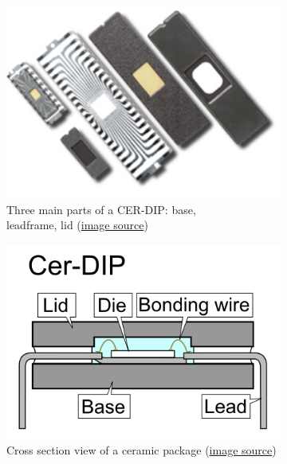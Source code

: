 \documentclass[final]{cubedoc}
\begin{document}
	\begin{figure}[h!]
		\centering
		\begin{subfigure}{.5\textwidth}
			\centering
			\includegraphics[height=0.2\textheight, width=\textwidth, keepaspectratio]{docs/cer_dip_real.png}
			\caption{Three main parts of a CER-DIP: base,\\ 
				leadframe, lid  \small{(\href{https://web.archive.org/web/20200818153119/https://www.spectrum-semi.com/cerdip}{image source}})}
			\label{fig:sub1}
		\end{subfigure}%
		\begin{subfigure}{.5\textwidth}
			\centering
			\includegraphics[height=0.2\textheight, width=\textwidth, keepaspectratio]{docs/cdip.PNG}
			\caption{Cross section view of a ceramic package \small{(\href{https://web.archive.org/web/20200818153102/https://commons.wikimedia.org/wiki/File:Cer-DIP_package_sideview.PNG}{image source})}}
			\label{fig:sub2}
		\end{subfigure}
		\caption{}
		\label{fig:test}
	\end{figure}
	
\end{document}
